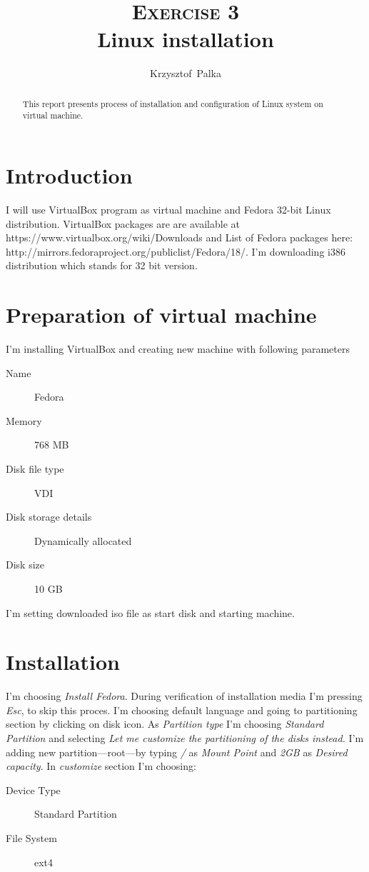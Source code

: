 \documentclass[a4paper,12pt]{article}
\author{Krzysztof~Palka}
\title{\textsc{Exercise} 3 \\ Linux installation}
\begin{document}
    \maketitle

    \begin{abstract}
        This report presents process of installation and configuration of Linux system on virtual machine. 
    \end{abstract}

	\section{Introduction}
    I will use VirtualBox program as virtual machine and Fedora 32-bit Linux distribution. VirtualBox packages are are available at https://www.virtualbox.org/wiki/Downloads and List of Fedora packages here: http://mirrors.fedoraproject.org/publiclist/Fedora/18/. I'm downloading i386 distribution which stands for 32 bit version.  

    \section{Preparation of virtual machine}
    I'm installing VirtualBox and creating new machine with following parameters
    \begin{description}
        \item[Name] Fedora
        \item[Memory] 768 MB
        \item[Disk file type] VDI
        \item[Disk storage details] Dynamically allocated
        \item[Disk size] 10 GB
    \end{description}
    
    I'm setting downloaded iso file as start disk and starting machine.
    \section{Installation}
    I'm choosing \emph{Install Fedora}. During verification of installation media I'm pressing \emph{Esc}, to skip this proces.
    I'm choosing default language and going to partitioning section by clicking on disk icon. As \emph{Partition type} I'm choosing \emph{Standard Partition} and selecting \emph{Let me customize the partitioning of the disks instead.}    
    I'm adding new partition---root---by typing \emph{/} as \emph{Mount Point} and \emph{2GB} as \emph{Desired capacity}. 
    In \emph{customize} section I'm choosing: 
    \begin{description}
        \item[Device Type] Standard Partition
        \item[File System] ext4
    \end{description}
    
\end{document}
